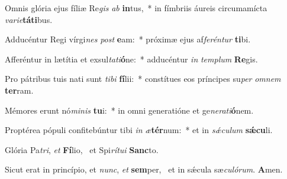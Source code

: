 \item Omnis glória ejus fíliæ Re\textit{gis} \textit{ab} \textbf{in}tus,~* in fímbriis áureis circumamícta \textit{va}\textit{ri}\textit{e}\textbf{tá}\textbf{ti}bus.
\item Adducéntur Regi vírgi\textit{nes} \textit{post} \textbf{e}am:~* próximæ ejus af\textit{fe}\textit{rén}\textit{tur} \textbf{ti}bi.
\item Afferéntur in lætítia et exsul\textit{ta}\textit{ti}\textbf{ó}ne:~* adducéntur \textit{in} \textit{tem}\textit{plum} \textbf{Re}gis.
\item Pro pátribus tuis nati sunt \textit{ti}\textit{bi} \textbf{fí}lii:~* constítues eos príncipes su\textit{per} \textit{om}\textit{nem} \textbf{ter}ram.
\item Mémores erunt nó\textit{mi}\textit{nis} \textbf{tu}i:~* in omni generatióne et ge\textit{ne}\textit{ra}\textit{ti}\textbf{ó}nem.
\item Proptérea pópuli confitebúntur tibi \textit{in} \textit{æ}\textbf{tér}num:~* et in \textit{sǽ}\textit{cu}\textit{lum} \textbf{sǽ}\textbf{cu}li.
\item Glória Pa\textit{tri}, \textit{et} \textbf{Fí}lio,~\psstar{} et Spi\textit{rí}\textit{tu}\textit{i} \textbf{Sanc}to.
\item Sicut erat in princípio, et \textit{nunc}, \textit{et} \textbf{sem}per,~\psstar{} et in sǽcula sæ\textit{cu}\textit{ló}\textit{rum}. \textbf{A}men.
